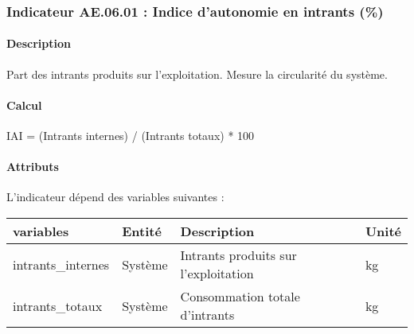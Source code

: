 \documentclass[
]{article}
\newenvironment{Shaded}{\begin{snugshade}}{\end{snugshade}}
\newcommand{\NormalTok}[1]{#1}
\begin{document}
\subsubsection{Indicateur AE.06.01 : Indice d'autonomie en intrants
(\%)}\label{indicateur-ae.06.01-indice-dautonomie-en-intrants}

\paragraph{Description}\label{description-13}

Part des intrants produits sur l'exploitation. Mesure la circularité du
système.

\paragraph{Calcul}\label{calcul-13}

\begin{Shaded}
\begin{Highlighting}[]
\NormalTok{IAI = (Intrants internes) / (Intrants totaux) * 100}
\end{Highlighting}
\end{Shaded}

\paragraph{Attributs}\label{attributs-31}

L'indicateur dépend des variables suivantes :

\begin{longtable}[]{@{}
  >{\raggedright\arraybackslash}p{}
  >{\raggedright\arraybackslash}p{}
  >{\raggedright\arraybackslash}p{}
  >{\raggedright\arraybackslash}p{}@{}}
\toprule\noalign{}
\begin{minipage}[b]{\linewidth}\raggedright
\textbf{variables}
\end{minipage} & \begin{minipage}[b]{\linewidth}\raggedright
\textbf{Entité}
\end{minipage} & \begin{minipage}[b]{\linewidth}\raggedright
\textbf{Description}
\end{minipage} & \begin{minipage}[b]{\linewidth}\raggedright
\textbf{Unité}
\end{minipage} \\
\midrule\noalign{}
\endhead
\bottomrule\noalign{}
\endlastfoot
intrants\_internes & Système & Intrants produits sur l'exploitation &
kg \\
intrants\_totaux & Système & Consommation totale d'intrants & kg \\
\end{longtable}
\end{document}
